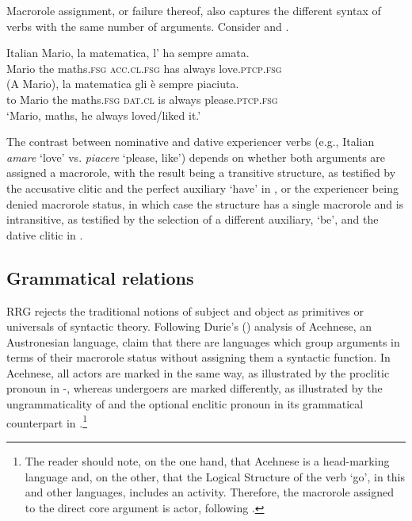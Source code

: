 \documentclass[output=paper,hidelinks]{langscibook}
\begin{document}
  Macrorole assignment, or failure thereof, also captures the different syntax of verbs with the same number of arguments. Consider  and .

\newpage
\ea%
 \label{ex:RRG:13}Italian
 \ea\label{ex:RRG:13a}
 \gll Mario,  la  matematica,  l'   ha  sempre  amata.\\
   Mario  the  maths.\textsc{fsg}  \textsc{acc.cl.fsg}  has  always  love.\textsc{ptcp.fsg}\\
 \ex\label{ex:RRG:13b}
    \gll (A  Mario),  la  matematica  gli  è  sempre  piaciuta.\\
      to  Mario  the  maths.\textsc{fsg}  \textsc{dat.cl} is  always  please.\textsc{ptcp.fsg} \\
   \glt `Mario, maths, he always loved/liked it.'
\z\z

\noindent The contrast between nominative and dative experiencer verbs (e.g., Italian \textit{ama\-re} `love' vs. \textit{piacere} `please, like') depends on whether both arguments are assigned a macrorole, with the result being a transitive structure, as testified by the accusative clitic and the perfect auxiliary `have' in , or the experiencer being denied macrorole status, in which case the structure has a single macrorole and is intransitive, as testified by the selection of a different auxiliary, `be', and the dative clitic in .

\subsection{Grammatical relations}
\label{sec:RRG:2.3}

RRG rejects the traditional notions of subject and object as primitives or universals of syntactic theory. Following Durie's (\citeyear{Durie1985,Durie1987}) analysis of Acehnese, an Austronesian language, \citet[255-260]{VanValin1997} claim that there are languages which group arguments in terms of their macrorole status without assigning them a syntactic function. In Acehnese, all actors are marked in the same way, as illustrated by the proclitic pronoun in -, whereas undergoers are marked differently, as illustrated by the ungrammaticality of  and the optional enclitic pronoun in its grammatical counterpart in .\footnote{The reader should note, on the one hand, that Acehnese is a head-marking language and, on the other, that the Logical Structure of the verb `go', in this and other languages, includes an activity. Therefore, the macrorole assigned to the direct core argument is actor, following .}
\end{document}
